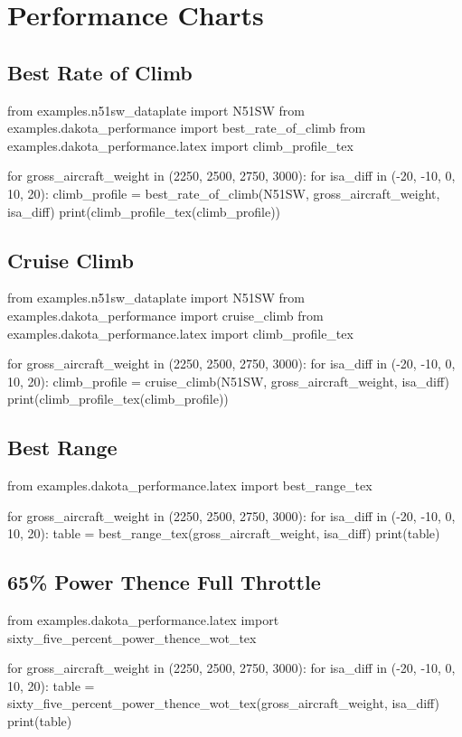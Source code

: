 \section{Performance Charts}

\pagebreak

\subsection{Best Rate of Climb}

\begin{pycode}
from examples.n51sw_dataplate import N51SW
from examples.dakota_performance import best_rate_of_climb
from examples.dakota_performance.latex import climb_profile_tex

for gross_aircraft_weight in (2250, 2500, 2750, 3000):
    for isa_diff in (-20, -10, 0, 10, 20):
        climb_profile = best_rate_of_climb(N51SW, gross_aircraft_weight, isa_diff)
        print(climb_profile_tex(climb_profile))
\end{pycode}

\subsection{Cruise Climb}

\begin{pycode}
from examples.n51sw_dataplate import N51SW
from examples.dakota_performance import cruise_climb
from examples.dakota_performance.latex import climb_profile_tex

for gross_aircraft_weight in (2250, 2500, 2750, 3000):
    for isa_diff in (-20, -10, 0, 10, 20):
        climb_profile = cruise_climb(N51SW, gross_aircraft_weight, isa_diff)
        print(climb_profile_tex(climb_profile))
\end{pycode}

\subsection{Best Range}

\begin{pycode}
from examples.dakota_performance.latex import best_range_tex

for gross_aircraft_weight in (2250, 2500, 2750, 3000):
    for isa_diff in (-20, -10, 0, 10, 20):
         table = best_range_tex(gross_aircraft_weight, isa_diff)
         print(table)
\end{pycode}

\subsection{65\% Power Thence Full Throttle}

\begin{pycode}
from examples.dakota_performance.latex import sixty_five_percent_power_thence_wot_tex

for gross_aircraft_weight in (2250, 2500, 2750, 3000):
    for isa_diff in (-20, -10, 0, 10, 20):
        table = sixty_five_percent_power_thence_wot_tex(gross_aircraft_weight, isa_diff)
        print(table)
\end{pycode}

